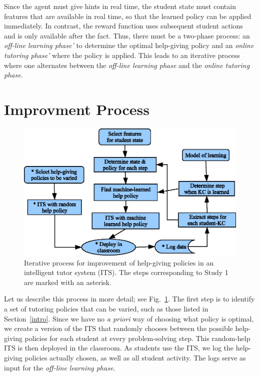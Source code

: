 \documentclass{edm_template}
\begin{document}
Since the agent must give hints in real time, the student state
must contain features that are available in real time, so that
the learned policy can be applied immediately.  In contrast,
the reward function uses subsequent student actions and is only
available after the fact.  Thus, there must be a two-phase process:
an {\em off-line learning phase'} to determine the optimal help-giving 
policy and an {\em online tutoring phase'} where the policy is applied.
This leads to an iterative process where one alternates between 
the {\em off-line learning phase} and the {\em online tutoring phase}.

\section{Improvment Process}
%
%
%
\begin{figure}
\centering    \includegraphics{process.eps}
\caption{Iterative process for improvement of help-giving policies in
  an intelligent  tutor system (ITS).  The steps corresponding to Study 1 are marked
  with an asterisk.} \label{process}
\end{figure}

Let us describe this process in more detail; see Fig.~\ref{process}.  The first
step is to identify a set of tutoring policies that can be varied,
such as those listed in Section~\ref{intro}.  Since we have no {\em a priori}
way of choosing what policy is optimal, we create a version of the ITS
that randomly chooses between the possible help-giving policies for each student
at every problem-solving step.  This random-help ITS is then deployed
in the classroom.  As students use the ITS, we log the help-giving policies actually chosen, as well
as all student activity.  The logs serve as input for the
{\em off-line learning phase}.
\end{document}
